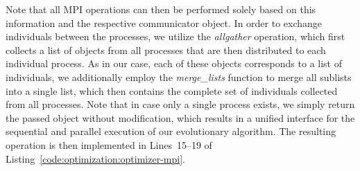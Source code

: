 Note that all MPI operations can then be performed solely based on this information and the respective communicator object.
In order to exchange individuals between the processes, we utilize the \emph{allgather} operation, which first collects a list of objects from all processes that are then distributed to each individual process.
As in our case, each of these objects corresponds to a list of individuals, we additionally employ the \emph{merge\_lists} function to merge all sublists into a single list, which then contains the complete set of individuals collected from all processes.
Note that in case only a single process exists, we simply return the passed object without modification, which results in a unified interface for the sequential and parallel execution of our evolutionary algorithm.
The resulting operation is then implemented in Lines~15--19 of Listing~\ref{code:optimization:optimizer-mpi}. 

